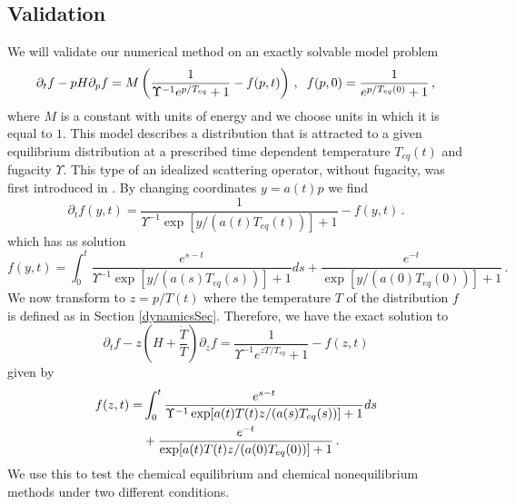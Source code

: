 \subsection{Validation}\label{validation}
We will validate our numerical method on an exactly solvable model problem
\begin{equation}\label{toyEq}
\partial_t f-pH \partial_p f=M\left(\frac{1}{\Upsilon^{-1}e^{p/T_{eq}}+1}-f(p,t)\right)\,, \hspace{2mm} f(p,0)=\frac{1}{e^{p/T_{eq}(0)}+1}\,,
\end{equation}
where $M$ is a constant with units of energy and we choose units in which it is equal to $1$. This model describes a distribution that is attracted to a given equilibrium distribution at a prescribed time dependent temperature $T_{eq}(t)$ and fugacity $\Upsilon$. This type of an idealized scattering operator, without fugacity, was first introduced in \cite{Anderson:1974nyl}. By changing coordinates $y=a(t)p$ we find
\begin{equation}\label{freeStreamToy}
\partial_tf(y,t)=\frac{1}{\Upsilon^{-1}\exp[y/(a(t)T_{eq}(t))]+1}-f(y,t)\,.
\end{equation}
 which has as solution
\begin{equation}\label{exactSol}
f(y,t)=\int_0^t\frac{e^{s-t}}{\Upsilon^{-1}\exp[y/(a(s)T_{eq}(s))]+1}ds+\frac{e^{-t}}{\exp[y/(a(0)T_{eq}(0))]+1}\,.
\end{equation}
We now transform to $z=p/T(t)$ where the temperature $T$ of the distribution $f$ is defined as in Section \ref{dynamicsSec}.  Therefore, we have the exact solution to
\begin{equation}\label{kEqToy}
\partial_tf-z\left(H+\frac{\dot{T}}{T}\right)\partial_zf=\frac{1}{\Upsilon^{-1}e^{zT/T_{eq}}+1}-f(z,t)
\end{equation}
given by
\begin{align}
f(z,t)=&\int_0^t\frac{e^{s-t}}{\Upsilon^{-1}\exp[a(t)T(t)z/(a(s)T_{eq}(s))]+1}ds\\
&+\frac{e^{-t}}{\exp[a(t)T(t)z/(a(0)T_{eq}(0))]+1}\,.\notag
\end{align}
We use this to test the chemical equilibrium and chemical nonequilibrium methods under two different conditions. 

